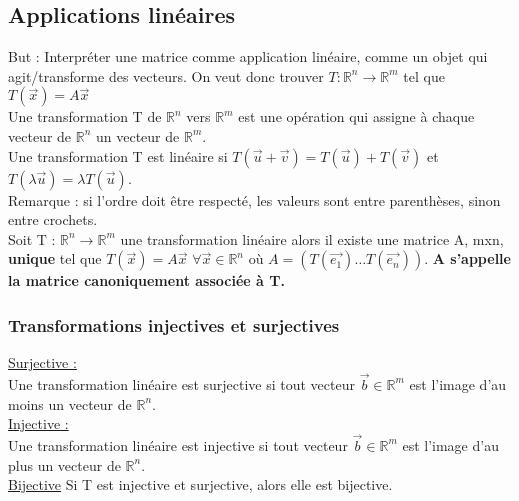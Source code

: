 \documentclass[../main.tex]{subfiles}
\begin{document}
\subsection{Applications linéaires}
But : Interpréter une matrice comme application linéaire, comme un objet qui agit/transforme des vecteurs. On veut donc trouver $T:\mathbb{R}^n \rightarrow \mathbb{R}^m$ tel que $T(\vec{x}) = A\vec{x}$\\
Une transformation T de $\mathbb{R}^n$ vers $\mathbb{R}^m$ est une opération qui assigne à chaque vecteur de $\mathbb{R}^n$ un vecteur de $\mathbb{R}^m$.\\
Une transformation T est linéaire si $T( \vec{u} + \vec{v}) = T(\vec{u}) + T(\vec{v})$ et $T(\lambda \vec{u}) = \lambda T(\vec{u})$.\\
\color{gray} Remarque : si l'ordre doit être respecté, les valeurs sont entre parenthèses, sinon entre crochets.\color{black}\\

Soit T : $\mathbb{R}^n \rightarrow \mathbb{R}^m$ une transformation linéaire alors il existe une matrice A, mxn, \textbf{unique} tel que $T(\vec{x}) = A\vec{x}$ $\forall \vec{x} \in \mathbb{R}^n$ où $A = (T(\vec{e_1}) \dots T(\vec{e_n}))$. \textbf{A s'appelle la matrice canoniquement associée à T.}

\subsubsection{Transformations injectives et surjectives}
\quad \underline{Surjective :}\\
Une transformation linéaire est surjective si tout vecteur $\vec{b} \in \mathbb{R}^m$ est l'image d'au moins un vecteur de $\mathbb{R}^n$.\\

\quad \underline{Injective :}\\
Une transformation linéaire est injective si tout vecteur $\vec{b} \in \mathbb{R}^m$ est l'image d'au plus un vecteur de $\mathbb{R}^n$.\\

\quad \underline{Bijective}
Si T est injective et surjective, alors elle est bijective.\\
\end{document}
